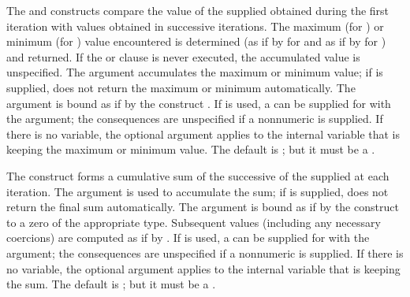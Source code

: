 The  and 
constructs compare
the value of the supplied  obtained during the first 
iteration with values obtained in successive iterations.
The maximum (for ) or minimum (for ) 
value encountered is determined 
(as if by  for  and
 as if by  for )
and returned.
If the  or  clause
is never executed, the accumulated value is unspecified.
The argument  accumulates the maximum or minimum value;
if  is supplied,
 does not return the maximum or minimum automatically.
The  argument is bound as if by the construct .
If   is used,
a  can be supplied for  with the  argument;
the consequences are unspecified if a nonnumeric  is supplied.           
If there is no  variable,
the optional  argument applies to the internal variable 
that is keeping the maximum or minimum value.  
The default  
is ; but it
must be a .
 
The  construct forms a cumulative sum 
of the successive  of the supplied 
at each iteration.
The argument  is used to accumulate the sum;
if  is supplied,
 does not return the final sum automatically.
The  argument is bound as if by the construct 
to a zero of the appropriate type.
Subsequent values (including any necessary coercions) are computed as if by \thefunction{+}.
If   is used,
a  can be supplied for  with the  argument;
the consequences are unspecified if a nonnumeric  is supplied.           
If there is no  variable,
the optional  argument applies to the internal variable
that is keeping the sum.
The default 
is ; but it
must be a .
 
